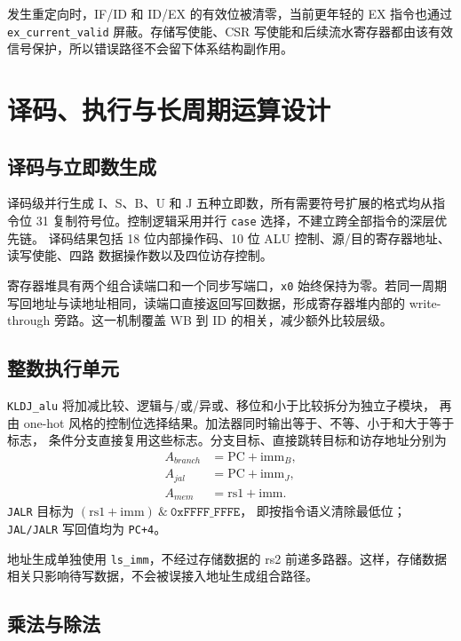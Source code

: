 \documentclass[UTF8,zihao=-4,a4paper]{ctexart}
\numberwithin{table}{section}
\numberwithin{figure}{section}
\newcommand{\code}[1]{\texttt{#1}}
\begin{document}
发生重定向时，IF/ID 和 ID/EX 的有效位被清零，当前更年轻的 EX 指令也通过
\code{ex\_current\_valid} 屏蔽。存储写使能、CSR 写使能和后续流水寄存器都由该有效
信号保护，所以错误路径不会留下体系结构副作用。

\section{译码、执行与长周期运算设计}

\subsection{译码与立即数生成}

译码级并行生成 I、S、B、U 和 J 五种立即数，所有需要符号扩展的格式均从指令位 31
复制符号位。控制逻辑采用并行 \code{case} 选择，不建立跨全部指令的深层优先链。
译码结果包括 18 位内部操作码、10 位 ALU 控制、源/目的寄存器地址、读写使能、四路
数据操作数以及四位访存控制。

寄存器堆具有两个组合读端口和一个同步写端口，\code{x0} 始终保持为零。若同一周期
写回地址与读地址相同，读端口直接返回写回数据，形成寄存器堆内部的 write-through
旁路。这一机制覆盖 WB 到 ID 的相关，减少额外比较层级。

\subsection{整数执行单元}

\code{KLDJ\_alu} 将加减比较、逻辑与/或/异或、移位和小于比较拆分为独立子模块，
再由 one-hot 风格的控制位选择结果。加法器同时输出等于、不等、小于和大于等于标志，
条件分支直接复用这些标志。分支目标、直接跳转目标和访存地址分别为
\begin{align}
  A_{branch} &= \mathrm{PC}+\mathrm{imm}_B,\\
  A_{jal} &= \mathrm{PC}+\mathrm{imm}_J,\\
  A_{mem} &= \mathrm{rs1}+\mathrm{imm}.
\end{align}
\code{JALR} 目标为 \((\mathrm{rs1}+\mathrm{imm})\ \&\ \mathtt{0xFFFF\_FFFE}\)，
即按指令语义清除最低位；\code{JAL/JALR} 写回值均为 \code{PC+4}。

地址生成单独使用 \code{ls\_imm}，不经过存储数据的 rs2 前递多路器。这样，存储数据
相关只影响待写数据，不会被误接入地址生成组合路径。

\subsection{乘法与除法}
\end{document}
